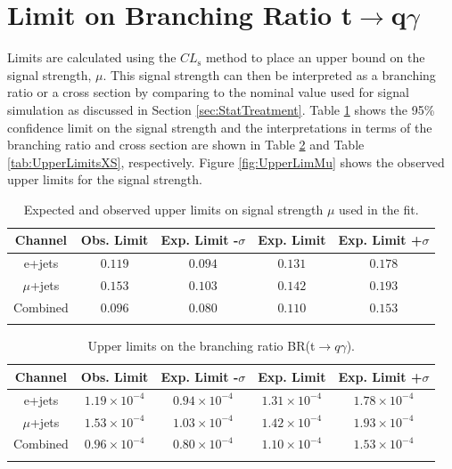 \section{Limit on Branching Ratio t$\rightarrow$q$\gamma$}
\label{sec:Limits}
Limits are calculated using the $CL_\text{s}$ method to place an upper bound on the signal strength, $\mu$.  This signal strength can then be interpreted as a branching ratio or a cross section by comparing to the nominal value used for signal simulation as discussed in Section \ref{sec:StatTreatment}.  Table \ref{tab:UpperLimitsMu} shows the 95\% confidence limit on the signal strength and the interpretations in terms of the branching ratio and cross section are shown in Table \ref{tab:UpperLimitsBR} and Table \ref{tab:UpperLimitsXS}, respectively. Figure \ref{fig:UpperLimMu} shows the observed upper limits for the signal strength.
\begin{table}[h!]
\begin{center}
{\renewcommand{\arraystretch}{1.2}
\begin{tabular}{ccccc}
\hhline{=====}
Channel  	&  Obs. Limit			&	Exp. Limit -$\sigma$	& Exp. Limit	& Exp. Limit +$\sigma$  \\  \hline 
e+jets	& $0.119$ 	& $0.094$	& $0.131$ & $0.178$	\\ 
$\mu$+jets	& $0.153$ 	& $0.103$	& $0.142$ & $0.193$	\\ 
Combined	& $0.096$ 	& $0.080$	& $0.110$ & $0.153$	\\
\hhline{=====}
\end{tabular}
\caption{Expected and observed upper limits on signal strength $\mu$ used in the fit.}
\label{tab:UpperLimitsMu}
}
\end{center}
\end{table}


\begin{table}[h!]
\begin{center}
{\renewcommand{\arraystretch}{1.2}
\begin{tabular}{ccccc}
\hhline{=====}
Channel  	&  Obs. Limit			&	Exp. Limit -$\sigma$	& Exp. Limit	& Exp. Limit +$\sigma$  \\  \hline 
e+jets	& $1.19\times10^{-4}$ 	& $0.94\times10^{-4}$	& $1.31\times10^{-4}$ & $1.78\times10^{-4}$	\\ 
$\mu$+jets	& $1.53\times10^{-4}$ 	& $1.03\times10^{-4}$	& $1.42\times10^{-4}$ & $1.93\times10^{-4}$	\\ 
Combined	& $0.96\times10^{-4}$ 	& $0.80\times10^{-4}$	& $1.10\times10^{-4}$ & $1.53\times10^{-4}$	\\
\hhline{=====}
\end{tabular}
\caption{Upper limits on the branching ratio BR(t$\rightarrow q \gamma$).}
\label{tab:UpperLimitsBR}
}
\end{center}
\end{table}

